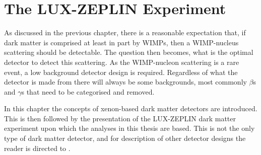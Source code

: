 \chapter{The LUX-ZEPLIN Experiment}
\label{sec:lz_detector_chapter}
\par
As discussed in the previous chapter, there is a reasonable expectation that, if dark matter is comprised at least in part by WIMPs, then a WIMP-nucleus scattering should be detectable.
The question then becomes, what is the optimal detector to detect this scattering.
As the WIMP-nucleon scattering is a rare event, a low background detector design is required.
Regardless of what the detector is made from there will always be some backgrounds, most commonly $\beta$s and $\gamma$s that need to be categorised and removed.
\par
In this chapter the concepts of xenon-based dark matter detectors are introduced.
This is then followed by the presentation of the LUX-ZEPLIN dark matter experiment upon which the analyses in this thesis are based.
This is not the only type of dark matter detector, and for description of other detector designs the reader is directed to \cite{direct_detector_designs_ref}.





%